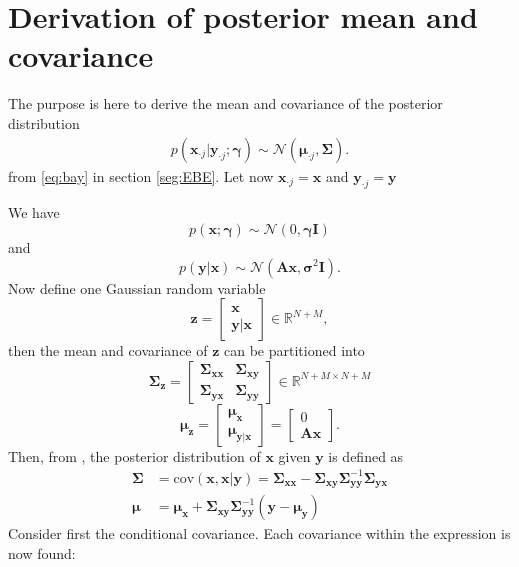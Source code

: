 \section{Derivation of posterior  mean and covariance}\label{app_sec:mean_cov}
The purpose is here to derive the mean and covariance of the posterior distribution
\begin{align*}
p\left( \textbf{x}_{\cdot j} \vert \textbf{y}_{\cdot j}; \boldsymbol{\gamma}\right) \sim \mathcal{N}(\boldsymbol{\mu} _{\cdot j},\boldsymbol{\Sigma}).
\end{align*}
from \eqref{eq:bay} in section \ref{seg:EBE}. Let now $\textbf{x}_{\cdot j} = \textbf{x}$ and $\textbf{y}_{\cdot j} = \textbf{y}$

We have 
$$
p(\textbf{x};\boldsymbol{\gamma}) \sim \mathcal{N}(0,\boldsymbol{\gamma} \textbf{I} )
$$
and 
$$
p(\textbf{y}\vert \textbf{x}) \sim \mathcal{N}(\textbf{A}\textbf{x}, \boldsymbol{\sigma}^2\textbf{I}).
$$ 
Now define one Gaussian random variable  
$$
\textbf{z} = \begin{bmatrix}
\textbf{x} \\ 
\textbf{y}\vert \textbf{x} 
\end{bmatrix} \in \mathbb{R}^{N + M},	
$$   
then the mean and covariance of $\textbf{z}$ can be partitioned into 
$$
\boldsymbol{\Sigma}_{\textbf{z}} = \begin{bmatrix}
\boldsymbol{\Sigma}_{\textbf{x}\textbf{x}} & \boldsymbol{\Sigma}_{\textbf{x}\textbf{y}} \\ 
\boldsymbol{\Sigma}_{\textbf{y}\textbf{x}} & \boldsymbol{\Sigma}_{\textbf{y}\textbf{y}}
\end{bmatrix} \in \mathbb{R}^{N+M \times N+M}
$$
$$
\boldsymbol{\mu}_{\textbf{z}}  = \begin{bmatrix}
\boldsymbol{\mu}_{\textbf{x}}  \\ 
 \boldsymbol{\mu}_{\textbf{y}\vert \textbf{x}}
\end{bmatrix} = 
 \begin{bmatrix}
0  \\ 
\textbf{A}\textbf{x}
\end{bmatrix}.
$$
Then, from \cite{conditional_cov}, the posterior distribution of $\textbf{x}$ given $\textbf{y}$ is defined as
\begin{align*}
\boldsymbol{\Sigma} &= \text{cov}(\textbf{x},\textbf{x}\vert \textbf{y}) =  \boldsymbol{\Sigma}_{\textbf{xx}} - \boldsymbol{\Sigma}_{\textbf{xy}}\boldsymbol{\Sigma}_{\textbf{yy}}^{-1}\boldsymbol{\Sigma}_{\textbf{yx}} \\
\boldsymbol{\mu} &= \boldsymbol{\mu}_{\textbf{x}}+\boldsymbol{\Sigma}_{\textbf{xy}}\boldsymbol{\Sigma}_{\textbf{yy}}^{-1}(\textbf{y}-\boldsymbol{\mu}_{\textbf{y}})
\end{align*}
Consider first the conditional covariance. Each covariance within the expression is now found:

